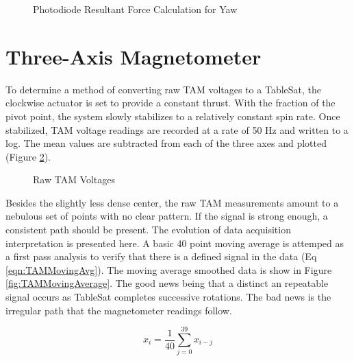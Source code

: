 \begin{figure}[H]
\centerline{}
\caption{Photodiode Resultant Force Calculation for Yaw}
\label{fig:CSSVectors}
\end{figure}

\section{Three-Axis Magnetometer}
\label{sec:TheeAxisMagnetometer}

To determine a method of converting raw TAM voltages to a TableSat, the clockwise actuator is set to provide a constant thrust.  With the fraction of the pivot point, the system slowly stabilizes to a relatively constant spin rate.  Once stabilized, TAM voltage readings are recorded at a rate of 50 Hz and written to a log.  The mean values are subtracted from each of the three axes and plotted (Figure \ref{fig:TAMRaw}).

\begin{figure}[H]
\centerline{}
\caption{Raw TAM Voltages}
\label{fig:TAMRaw}
\end{figure}

Besides the slightly less dense center, the raw TAM measurements amount to a nebulous set of points with no clear pattern.  If the signal is strong enough, a consistent path should be present.  The evolution of data acquisition interpretation is presented here.  A basic 40 point moving average is attemped as a first pass analysis to verify that there is a defined signal in the data (Eq \ref{eqn:TAMMovingAvg}).  The moving average smoothed data is show in Figure \ref{fig:TAMMovingAverage}.  The good news being that a distinct an repeatable signal occurs as TableSat completes successive rotations.  The bad news is the irregular path that the magnetometer readings follow.

\begin{equation}
  x_i = \frac{1}{40} \sum^{39}_{j=0} x_{i-j}
  \label{eqn:TAMMovingAvg}
\end{equation}


